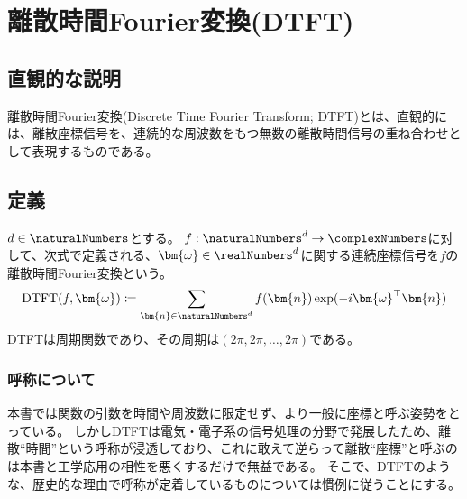 		\chapter{離散時間Fourier変換(DTFT)}
			\section{直観的な説明}
				離散時間Fourier変換(Discrete Time Fourier Transform; DTFT)とは、直観的には、離散座標信号を、連続的な周波数をもつ無数の離散時間信号の重ね合わせとして表現するものである。
			\section{定義}
				$d\in\naturalNumbers$とする。
				$f:\naturalNumbers^d\to\complexNumbers$に対して、次式で定義される、$\bm{\omega}\in\realNumbers^d$に関する連続座標信号を$f$の離散時間Fourier変換という。
				\[ \text{DTFT}(f,\bm{\omega}) \coloneqq \sum_{\bm{n}\in\naturalNumbers^d} f(\bm{n})\exp(-i\bm{\omega}^\top\bm{n}) \]
				DTFTは周期関数であり、その周期は$(2\pi,2\pi,\dotsc,2\pi)$である。
				\subsection{呼称について}
					本書では関数の引数を時間や周波数に限定せず、より一般に座標と呼ぶ姿勢をとっている。
					しかしDTFTは電気・電子系の信号処理の分野で発展したため、離散``時間''という呼称が浸透しており、これに敢えて逆らって離散``座標''と呼ぶのは本書と工学応用の相性を悪くするだけで無益である。
					そこで、DTFTのような、歴史的な理由で呼称が定着しているものについては慣例に従うことにする。
